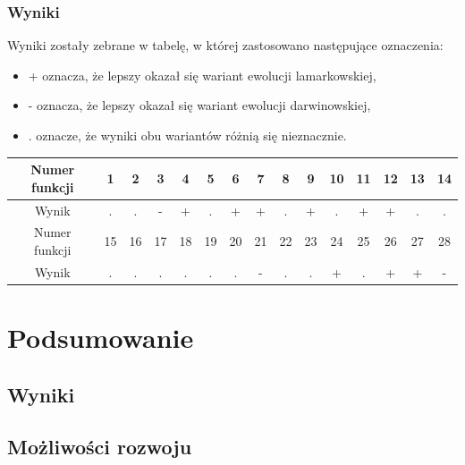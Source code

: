 \documentclass{mini}
\begin{document}
\subsubsection *{Wyniki}
Wyniki zostały zebrane w tabelę, w której zastosowano następujące oznaczenia:
\begin{itemize}[noitemsep]
\item + oznacza, że lepszy okazał się wariant ewolucji lamarkowskiej,
\item - oznacza, że lepszy okazał się wariant ewolucji darwinowskiej,
\item . oznacze, że wyniki obu wariantów różnią się nieznacznie.
\end{itemize}

\begin{tabular}{|c|c|c|c|c|c|c|c|c|c|c|c|c|c|c|} \hline
Numer funkcji & 1 & 2 & 3 & 4 & 5 & 6 & 7 & 8 & 9 & 10 & 11 & 12 & 13 & 14 \\ \hline
Wynik & . & . & - & + & . & + & + & . & + & . & + & + & . & . \\ \hline \hline
Numer funkcji & 15 & 16 & 17 & 18 & 19 & 20 & 21 & 22 & 23 & 24 & 25 & 26 & 27 & 28 \\ \hline
Wynik & . & . & . & . & . & . & - & . & . & + & . & + & + & - \\ \hline
\end{tabular}

\pagebreak

\section{Podsumowanie}

\subsection{Wyniki}

\subsection{Możliwości rozwoju}

\pagebreak
\end{document}
